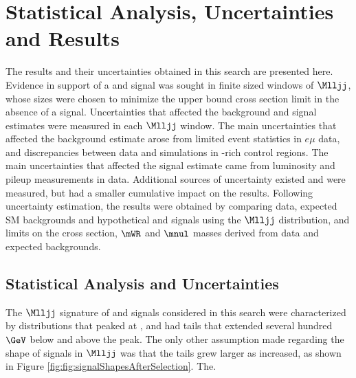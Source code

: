 \chapter{Statistical Analysis, Uncertainties and Results}
\label{statAnalysis_uncerts_results}
The results and their uncertainties obtained in this search are presented here.  Evidence in 
support of a \WR and \nul signal was sought in finite sized windows of $\Mlljj$, whose sizes 
were chosen to minimize the upper bound \WR cross section limit in the absence of a signal.  
Uncertainties that affected the background and signal estimates were measured in each $\Mlljj$ 
window.  The main uncertainties that affected the background estimate arose from limited event 
statistics in $e\mu$ data, and discrepancies between data and simulations in \DY-rich control 
regions.  The main uncertainties that affected the signal estimate came from luminosity and 
pileup measurements in data.  Additional sources of uncertainty existed and were measured, 
but had a smaller cumulative impact on the results.  Following uncertainty estimation, the 
results were obtained by comparing data, expected SM backgrounds and hypothetical 
\WR and \nul signals using the $\Mlljj$ distribution, and limits on the \WR cross section, 
$\mWR$ and $\mnul$ masses derived from data and expected backgrounds.

\section{Statistical Analysis and Uncertainties}
\label{sec:massWindows_uncertainties}
The $\Mlljj$ signature of \WR and \nul signals considered in this search were characterized 
by distributions that peaked at \mWR, and had tails that extended several hundred $\GeV$ 
below and above the peak.  The only other assumption made regarding the shape of signals in 
$\Mlljj$ was that the tails grew larger as \mWR increased, as shown in Figure \ref{fig:fig:signalShapesAfterSelection}.  
The.

